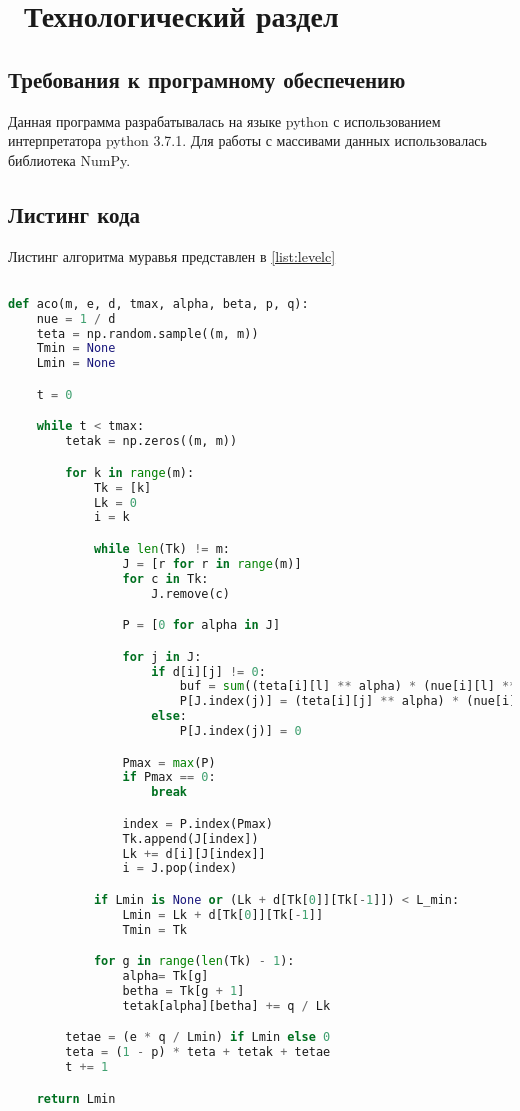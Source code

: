 \chapter{ Технологический раздел}
\section{ Требования к програмному обеспечению}
    Данная программа разрабатывалась на языке python с использованием интерпретатора python 3.7.1. Для работы с массивами данных использовалась библиотека NumPy.

\section{ Листинг кода}

Листинг алгоритма муравья представлен в  \ref{list:levelc}

\begin{lstlisting}[language=python, caption={ Реализация уровня C конвейера},
                    label={list:levelc}]

def aco(m, e, d, tmax, alpha, beta, p, q):
    nue = 1 / d
    teta = np.random.sample((m, m))
    Tmin = None
    Lmin = None

    t = 0

    while t < tmax:
        tetak = np.zeros((m, m))

        for k in range(m):
            Tk = [k]
            Lk = 0
            i = k

            while len(Tk) != m:
                J = [r for r in range(m)]
                for c in Tk:
                    J.remove(c)

                P = [0 for alpha in J]

                for j in J:
                    if d[i][j] != 0:
                        buf = sum((teta[i][l] ** alpha) * (nue[i][l] ** beta) for l in J)
                        P[J.index(j)] = (teta[i][j] ** alpha) * (nue[i][j] ** beta) / buf
                    else:
                        P[J.index(j)] = 0

                Pmax = max(P)
                if Pmax == 0:
                    break

                index = P.index(Pmax)
                Tk.append(J[index])
                Lk += d[i][J[index]]
                i = J.pop(index)

            if Lmin is None or (Lk + d[Tk[0]][Tk[-1]]) < L_min:
                Lmin = Lk + d[Tk[0]][Tk[-1]]
                Tmin = Tk

            for g in range(len(Tk) - 1):
                alpha= Tk[g]
                betha = Tk[g + 1]
                tetak[alpha][betha] += q / Lk

        tetae = (e * q / Lmin) if Lmin else 0
        teta = (1 - p) * teta + tetak + tetae
        t += 1

    return Lmin

\end{lstlisting}
